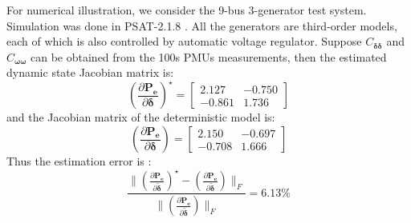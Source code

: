 \documentclass[journal]{IEEEtran}
\begin{document}
For numerical illustration, we consider the 9-bus 3-generator test system. Simulation was done in PSAT-2.1.8 \cite{Milano:PSAT}. All the generators are third-order models, each of which is also controlled by automatic voltage regulator. Suppose $C_{{\bm{\delta}}{\bm{\delta}}}$ and $C_{{\bm{\omega}}{\bm{\omega}}}$ can be obtained from the 100s PMUs measurements, then the estimated dynamic state Jacobian matrix is:
\begin{equation}
{(\frac{\partial\bm{P_e}}{\partial\bm{{\delta}}})^{\star}}=\left[ \begin{array}{cc} 2.127 & -0.750\\-0.861 & 1.736 \end{array}\right]
\end{equation}
and the Jacobian matrix of the deterministic model is:
\begin{equation}
{(\frac{\partial\bm{P_e}}{\partial\bm{{\delta}}})}=\left[ \begin{array}{cc} 2.150 & -0.697\\-0.708 & 1.666 \end{array}\right]
\end{equation}
Thus the estimation error is :
\begin{equation}
\frac{\|(\frac{\partial\bm{P_e}}{\partial\bm{\tilde{\delta}}})^\star-(\frac{\partial\bm{P_e}}{\partial\bm{\tilde{\delta}}})\|_F}{\|(\frac{\partial\bm{P_e}}{\partial\bm{\tilde{\delta}}})\|_F}=6.13\% \end{equation}
\end{document}
